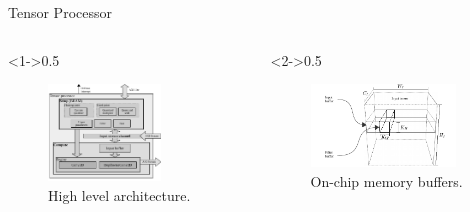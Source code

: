 \begin{frame}{Tensor Processor}
	\begin{columns}[c] %
		
		\begin{column}<1->{0.5\textwidth}
			\begin{figure}
				\includegraphics[width=0.7\textwidth]{../chapters/cnn_accelerator/figures/accelerator.pdf} %
				\caption{\scriptsize High level architecture.}
			\end{figure}
		\end{column}
		
		\begin{column}<2->{0.5\textwidth}
			\begin{figure}
				\includegraphics[width=0.9\textwidth]{../chapters/cnn_accelerator/figures/accelerator_buffers.pdf} %
				\caption{\scriptsize On-chip memory buffers.}
			\end{figure}
		\end{column}
		
	\end{columns}
\end{frame}

